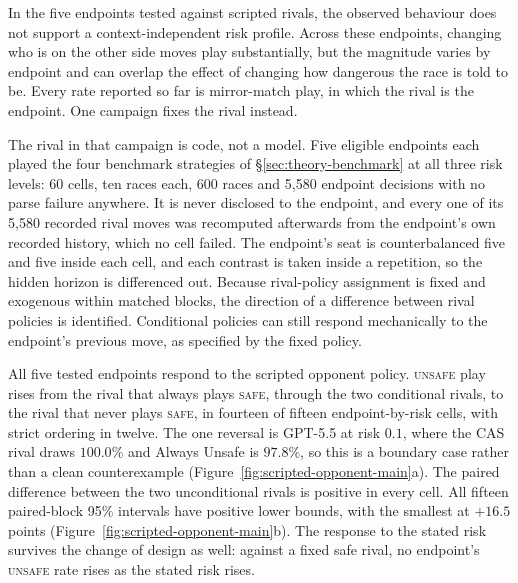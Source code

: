 \documentclass[sigconf,anonymous]{aamas}
\newcommand{\Safe}{\textsc{safe}}
\newcommand{\Unsafe}{\textsc{unsafe}}
\begin{document}
In the five endpoints tested against scripted rivals, the observed behaviour does
not support a context-independent risk profile. Across these endpoints, changing
who is on the other side moves play substantially, but the magnitude varies by
endpoint and can overlap the effect of changing how dangerous the race is told to
be. Every rate reported so far is mirror-match play, in which
the rival is the endpoint. One campaign fixes the rival instead.

The rival in that campaign is code, not a model. Five eligible endpoints each
played the four benchmark strategies of \S\ref{sec:theory-benchmark} at all
three risk levels: 60 cells, ten races each, 600 races and 5{,}580 endpoint
decisions with no parse failure anywhere. It is never disclosed to the endpoint,
and every one of its 5{,}580 recorded rival moves was
recomputed afterwards from the endpoint's own recorded history, which no cell
failed. The endpoint's seat is counterbalanced five and five inside each cell, and
each contrast is taken inside a repetition, so the hidden horizon is differenced
out. Because rival-policy assignment is fixed and exogenous within matched
blocks, the direction of a difference between rival policies is identified.
Conditional policies can still respond mechanically to the endpoint's previous
move, as specified by the fixed policy.

All five tested endpoints respond to the scripted opponent policy. \Unsafe{} play
rises from the rival that always plays \Safe{}, through the two conditional
rivals, to the rival that never plays \Safe{}, in fourteen of fifteen
endpoint-by-risk cells, with strict ordering in twelve. The one reversal is
GPT-5.5 at risk $0.1$, where the CAS rival draws $100.0\%$ and
Always Unsafe is $97.8\%$, so this is a boundary case rather than a clean
counterexample (Figure~\ref{fig:scripted-opponent-main}a). The paired
difference between the two unconditional rivals is
positive in every cell. All fifteen paired-block 95\% intervals have positive
lower bounds, with the smallest at $+16.5$ points
(Figure~\ref{fig:scripted-opponent-main}b). The response to the stated risk
survives the change of design as well: against a fixed safe rival, no endpoint's
\Unsafe{} rate rises as the stated risk rises.
\end{document}
